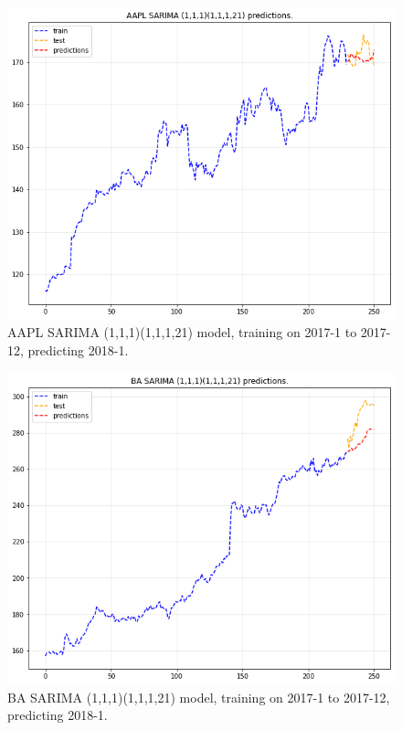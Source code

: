 \documentclass[11pt]{article}
\begin{document}
\begin{figure}[h!]
\centerline{\includegraphics[scale=0.5]{sarima_p1.png}}
\caption{AAPL SARIMA (1,1,1)(1,1,1,21) model, training on 2017-1 to 2017-12, predicting 2018-1.}
\end{figure}
\begin{figure}[h!]
\centerline{\includegraphics[scale=0.5]{sarima_p2.png}}
\caption{BA SARIMA (1,1,1)(1,1,1,21) model, training on 2017-1 to 2017-12, predicting 2018-1.}
\end{figure}
\end{document}
